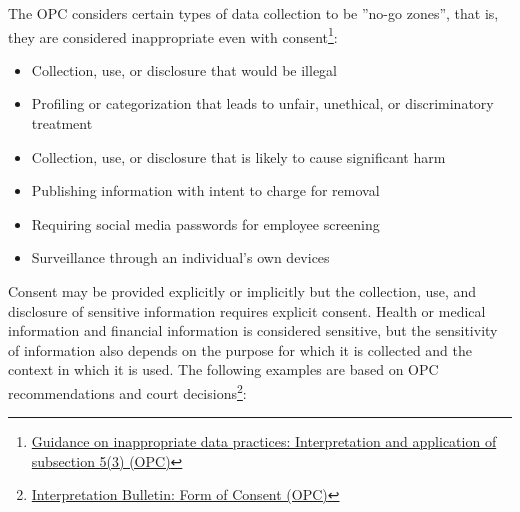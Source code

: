 The OPC considers certain types of data collection to be ''no-go zones'', that is, they are considered inappropriate even with consent\footnote{\href{https://www.priv.gc.ca/en/privacy-topics/collecting-personal-information/consent/gd_53_201805/}{Guidance on inappropriate data practices: Interpretation and application of subsection 5(3) (OPC)}}:
\begin{itemize}
   \item Collection, use, or disclosure that would be illegal
   \item Profiling or categorization that leads to unfair, unethical, or discriminatory treatment
   \item Collection, use, or disclosure that is likely to cause significant harm
   \item Publishing information with intent to charge for removal
   \item Requiring social media passwords for employee screening
   \item Surveillance through an individual's own devices
\end{itemize}

Consent may be provided explicitly or implicitly but the collection, use, and disclosure of sensitive information requires explicit consent. Health or medical information and financial information is considered sensitive, but the sensitivity of information also depends on the purpose for which it is collected and the context in which it is used. The following examples are based on OPC recommendations and court decisions\footnote{\href{https://www.priv.gc.ca/en/privacy-topics/privacy-laws-in-canada/the-personal-information-protection-and-electronic-documents-act-pipeda/pipeda-compliance-help/pipeda-interpretation-bulletins/interpretations_07_consent/}{Interpretation Bulletin: Form of Consent (OPC)}}:

